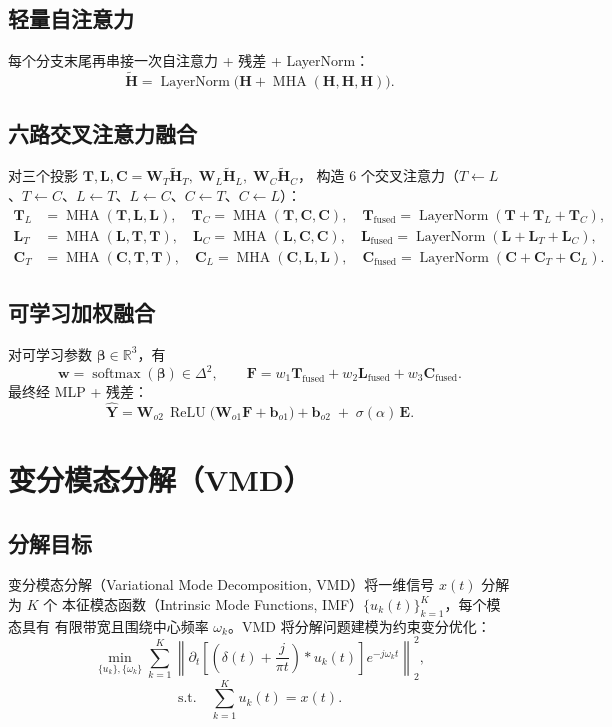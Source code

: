 \documentclass[11pt,a4paper]{article}
\newcommand{\R}{\mathbb{R}}
\DeclareMathOperator{\softmax}{softmax}
\DeclareMathOperator{\LayerNorm}{LayerNorm}
\DeclareMathOperator{\MHA}{MHA}
\DeclareMathOperator{\ReLU}{ReLU}
\newcommand{\mat}[1]{\bm{#1}}
\newcommand{\vect}[1]{\bm{#1}}
\begin{document}
\subsection{轻量自注意力}
每个分支末尾再串接一次自注意力 + 残差 + LayerNorm：
\[
\widetilde{\mat{H}} = \LayerNorm\bigl(\mat{H} + \MHA(\mat{H},\mat{H},\mat{H})\bigr).
\]

\subsection{六路交叉注意力融合}
对三个投影 $\mat{T},\mat{L},\mat{C} = \mat{W}_T\widetilde{\mat{H}}_T,\; \mat{W}_L\widetilde{\mat{H}}_L,\; \mat{W}_C\widetilde{\mat{H}}_C$，
构造 6 个交叉注意力（$T\!\leftarrow\!L$、$T\!\leftarrow\!C$、$L\!\leftarrow\!T$、$L\!\leftarrow\!C$、$C\!\leftarrow\!T$、$C\!\leftarrow\!L$）：
\begin{align}
\mat{T}_{L} &= \MHA(\mat{T},\mat{L},\mat{L}),\quad
\mat{T}_{C} = \MHA(\mat{T},\mat{C},\mat{C}),\quad
\mat{T}_{\text{fused}} = \LayerNorm(\mat{T} + \mat{T}_L + \mat{T}_C),\\
\mat{L}_{T} &= \MHA(\mat{L},\mat{T},\mat{T}),\quad
\mat{L}_{C} = \MHA(\mat{L},\mat{C},\mat{C}),\quad
\mat{L}_{\text{fused}} = \LayerNorm(\mat{L} + \mat{L}_T + \mat{L}_C),\\
\mat{C}_{T} &= \MHA(\mat{C},\mat{T},\mat{T}),\quad
\mat{C}_{L} = \MHA(\mat{C},\mat{L},\mat{L}),\quad
\mat{C}_{\text{fused}} = \LayerNorm(\mat{C} + \mat{C}_T + \mat{C}_L).
\end{align}

\subsection{可学习加权融合}
对可学习参数 $\vect{\beta} \in \R^3$，有
\[
\vect{w} = \softmax(\vect{\beta}) \in \Delta^{2},\qquad
\mat{F} = w_1\mat{T}_{\text{fused}} + w_2\mat{L}_{\text{fused}} + w_3\mat{C}_{\text{fused}}.
\]
最终经 MLP + 残差：
\[
\widehat{\mat{Y}} = \mat{W}_{o2}\,\ReLU\bigl(\mat{W}_{o1}\mat{F} + \vect{b}_{o1}\bigr) + \vect{b}_{o2}
\;+\; \sigma(\alpha)\,\mat{E}.
\]

\section{变分模态分解（VMD）}

\subsection{分解目标}
变分模态分解（Variational Mode Decomposition, VMD）将一维信号 $x(t)$ 分解为 $K$ 个
本征模态函数（Intrinsic Mode Functions, IMF）$\{u_k(t)\}_{k=1}^{K}$，每个模态具有
有限带宽且围绕中心频率 $\omega_k$。VMD 将分解问题建模为约束变分优化：
\begin{equation}\label{eq:vmd_obj}
\min_{\{u_k\},\{\omega_k\}} \sum_{k=1}^{K} \left\| \partial_t \left[ \left(\delta(t) + \frac{j}{\pi t}\right) * u_k(t) \right] e^{-j\omega_k t} \right\|_2^2,
\end{equation}
\[
\text{s.t.} \quad \sum_{k=1}^{K} u_k(t) = x(t).
\]
\end{document}
